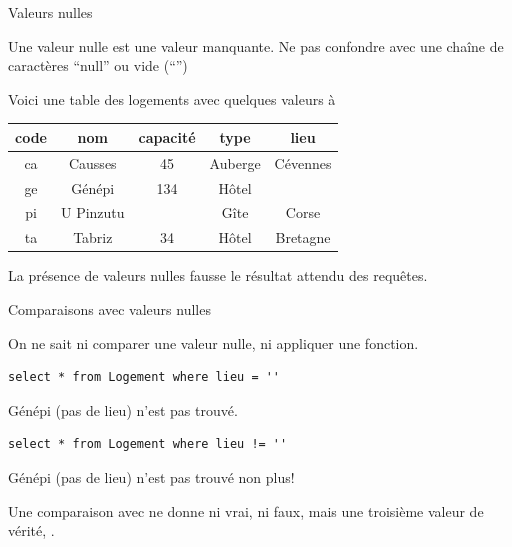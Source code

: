 
\begin{frame}[fragile]{Valeurs nulles}

Une \alert{valeur nulle} est une
\alert{valeur manquante}. Ne pas confondre avec une chaîne de caractères  ``null''  ou 
vide (``'')

\vfill

Voici une table des logements avec quelques valeurs à 

\vfill
\begin{tabular}{c|c|c|c|c}
\textbf{code} & \textbf{nom} & \textbf{capacité} & \textbf{type} & \textbf{lieu}\\ \hline 
ca & Causses & 45 & Auberge & Cévennes\\ \hline 
ge & Génépi & 134 & Hôtel & \\ \hline 
pi & U Pinzutu &  & Gîte & Corse\\ \hline 
ta & Tabriz & 34 & Hôtel & Bretagne\\ \hline 
\end{tabular}

\vfill

La présence de valeurs nulles \alert{fausse} le résultat attendu des requêtes.

\end{frame}


\begin{frame}[fragile]{Comparaisons avec valeurs nulles}

On ne sait ni comparer une valeur nulle, ni appliquer une fonction.

\vfill


\begin{verbatim}
select * from Logement where lieu = ''
\end{verbatim}

Génépi (pas de lieu) n'est pas trouvé.

\vfill

\begin{verbatim}
select * from Logement where lieu != ''
\end{verbatim}
Génépi (pas de lieu) n'est pas trouvé non plus!
\vfill

\begin{blocgauche}
Une comparaison avec  ne donne ni vrai, ni faux,
mais une troisième valeur de vérité, . 
\end{blocgauche}
\end{frame}


